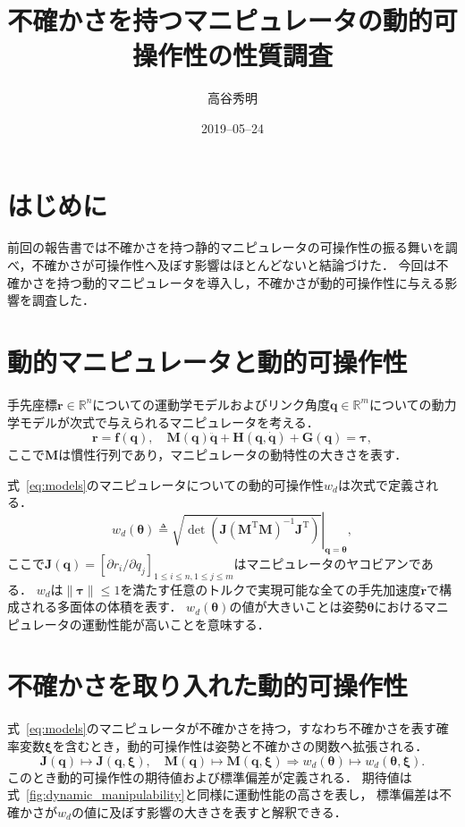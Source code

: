 \documentclass[10pt,a4j,twocolumn]{ltjsarticle}
\title{不確かさを持つマニピュレータの動的可操作性の性質調査} %
\author{高谷秀明}                              %
\date{2019--05--24}                              %
\begin{document}
\maketitle

\section{はじめに}

前回の報告書では不確かさを持つ静的マニピュレータの可操作性の振る舞いを調べ，不確かさが可操作性へ及ぼす影響はほとんどないと結論づけた．
今回は不確かさを持つ動的マニピュレータを導入し，不確かさが動的可操作性に与える影響を調査した．

\section{動的マニピュレータと動的可操作性}

手先座標$\bm{r} \in \mathbb{R}^{n}$についての運動学モデルおよびリンク角度$\bm{q} \in \mathbb{R}^{m}$についての動力学モデルが次式で与えられるマニピュレータを考える．
\begin{equation}
  \bm{r} = \bm{f}(\bm{q}),
  \quad
  \bm{M}(\bm{q}) \ddot{\bm{q}} + \bm{H}(\bm{q}, \dot{\bm{q}}) + \bm{G}(\bm{q}) = \bm{\tau},
  \label{eq:models}
\end{equation}
ここで$\bm{M}$は慣性行列であり，マニピュレータの動特性の大きさを表す．

式~\eqref{eq:models}のマニピュレータについての動的可操作性$w_{d}$は次式で定義される．
\begin{equation}
  w_{d}(\bm{\theta}) \triangleq \left. \sqrt{\det\left(\bm{J}\left(\bm{M}^{\mathrm{T}}\bm{M}\right)^{-1}\bm{J}^{\mathrm{T}}\right)} \right|_{\bm{q}=\bm{\theta}},
  \label{fig:dynamic_manipulability}
\end{equation}
ここで$\bm{J}(\bm{q}) = [\partial r_{i} / \partial q_{j}]_{1 \leq i \leq n, 1 \leq j \leq m}$はマニピュレータのヤコビアンである．
$w_{d}$は$\|\bm{\tau}\| \leq 1$を満たす任意のトルクで実現可能な全ての手先加速度$\ddot{\bm{r}}$で構成される多面体の体積を表す．
$w_{d}(\bm{\theta})$の値が大きいことは姿勢$\bm{\theta}$におけるマニピュレータの運動性能が高いことを意味する．

\section{不確かさを取り入れた動的可操作性}

式~\eqref{eq:models}のマニピュレータが不確かさを持つ，すなわち不確かさを表す確率変数$\bm{\xi}$を含むとき，動的可操作性は姿勢と不確かさの関数へ拡張される．
\begin{equation}
  \bm{J}(\bm{q}) \mapsto \bm{J}(\bm{q}, \bm{\xi}), \quad
  \bm{M}(\bm{q}) \mapsto \bm{M}(\bm{q}, \bm{\xi}) \Rightarrow
  w_d(\bm{\theta}) \mapsto w_d(\bm{\theta}, \bm{\xi}).
  \label{eq:expansion}
\end{equation}
このとき動的可操作性の期待値および標準偏差が定義される．
期待値は式~\eqref{fig:dynamic_manipulability}と同様に運動性能の高さを表し，
標準偏差は不確かさが$w_{d}$の値に及ぼす影響の大きさを表すと解釈できる．
\end{document}
